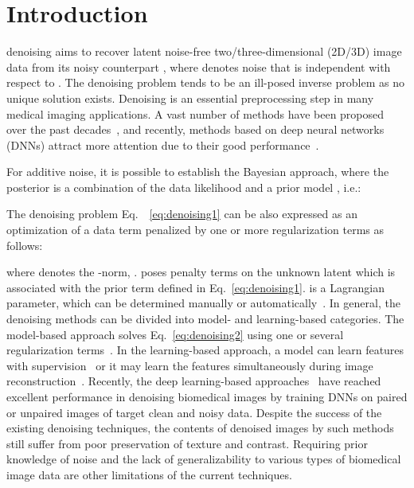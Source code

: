 \documentclass[journal,twoside,web]{ieeecolor}
\begin{document}
\section{Introduction}
\label{sec:introduction}
 denoising aims to recover latent noise-free two/three-dimensional (2D/3D) image data  from its noisy counterpart , where  denotes noise that is independent with respect to .
The denoising problem tends to be an ill-posed inverse problem as no unique solution exists. 
Denoising is an essential preprocessing step in many medical imaging applications. A vast number of methods have been proposed over the past decades~\cite{gal2009denoising,manjon2010adaptive,kaur2018review,sagheer2020review}, and recently, methods based on deep neural networks (DNNs) attract more attention due to their good performance~\cite{gondara2016medical,yang2018low,sharif2020learning,ma2020cycle,zhang2021plug}. 

For additive noise, it is possible to establish the Bayesian approach, where the posterior  is a combination of the data likelihood  and a prior model , i.e.:

The denoising problem Eq.~~\ref{eq:denoising1} can be also expressed as an optimization of a data term penalized by one or more regularization terms as follows:

where  denotes the -norm, .  poses penalty terms on the unknown latent  which is associated with the prior term  defined in Eq.~\ref{eq:denoising1}. 
 is a Lagrangian parameter, which can be determined manually or automatically~\cite{chan2011augmented,tiddeman2021principal}.
In general, the denoising methods can be divided into model- and learning-based categories. The model-based approach solves Eq.~\ref{eq:denoising2} using one or several regularization terms~\cite{getreuer2012rudin,mairal2009non,maggioni2012nonlocal,zhang2016statistical}. In the learning-based approach, a model can learn features with supervision~\cite{elad2006image,papyan2017convolutional} or it may learn the features simultaneously during image reconstruction~\cite{rai2021unsupervised}. 
Recently, the deep learning-based approaches~\cite{gondara2016medical,liu2018applications,li2021assessing} have reached excellent performance in denoising biomedical images by training DNNs on paired or unpaired images of target clean and noisy data. 
Despite the success of the existing denoising techniques, the contents of denoised images by such methods still suffer from poor preservation of texture and contrast. Requiring prior knowledge of noise and the lack of generalizability to various types of biomedical image data are other limitations of the current techniques. 
\end{document}
